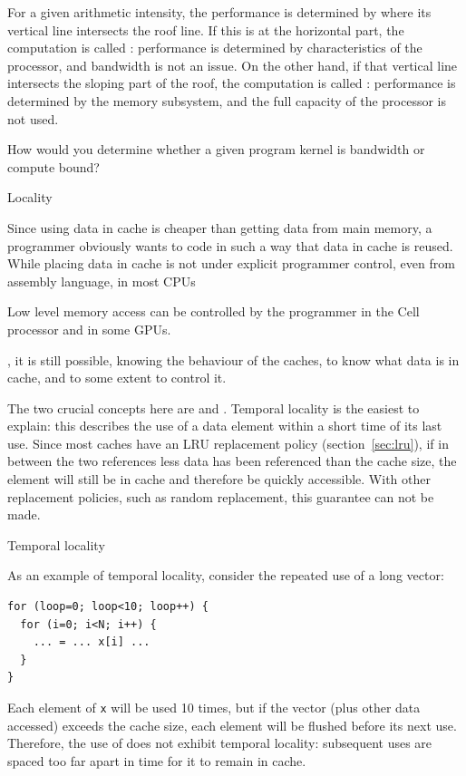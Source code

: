 For a given arithmetic intensity, the performance is determined by
where its vertical line intersects the roof line. If this is at the
horizontal part, the computation is called :
performance is determined by characteristics of the processor, and
bandwidth is not an issue. On the other hand, if that vertical line
intersects the sloping part of the roof, the computation is called
: performance is determined by the memory
subsystem, and the full capacity of the processor is not used.


\begin{exercise}
  How would you determine whether a given program kernel is bandwidth
  or compute bound?
\end{exercise}

 {Locality}
\label{sec:locality}

Since using data in cache is cheaper than getting data from main
memory, a programmer obviously wants to code in such a way that data
in cache is reused. While placing data in cache is not under explicit
programmer control, even from assembly language, in most
\acp{CPU}
\begin{footnoteenv}
  {Low level memory access can be controlled by the
    programmer in the Cell processor and in some GPUs.}
\end{footnoteenv}%
, it is still
possible, knowing the behaviour of the caches, to know
what data is in cache, and to some extent to control it.

The two crucial concepts here are
 and
. Temporal locality is the easiest to explain: this
describes the use of a data element within a short time of its last
use.  Since most caches have an \ac{LRU} replacement policy
(section~\ref{sec:lru}), if in between the two references less data
has been referenced than the cache size, the element will still be in
cache and therefore be quickly accessible. With other replacement
policies, such as random replacement, this guarantee can not be made.

 {Temporal locality}

As an example of temporal locality, consider the repeated use of a
long vector:
\begin{verbatim}
for (loop=0; loop<10; loop++) {
  for (i=0; i<N; i++) {
    ... = ... x[i] ...
  }
}
\end{verbatim}
Each element of \texttt{x} will be used 10 times, but if the vector
(plus other data accessed) exceeds
the cache size, each element will be flushed before its
next use. Therefore, the use of  does not exhibit temporal
locality: subsequent uses are spaced too far apart in time for it to
remain in cache. 

